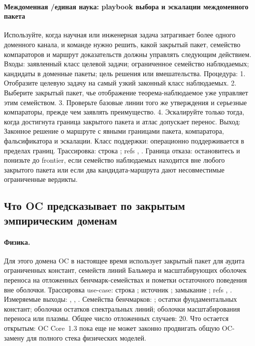 \paragraph{Междоменная /\allowbreak единая наука: playbook выбора и эскалации междоменного пакета}
Используйте, когда научная или инженерная задача затрагивает более одного доменного канала, и команде нужно решить, какой закрытый пакет, семейство компараторов и маршрут доказательств должны управлять следующим действием.
Входы: заявленный класс целевой задачи; \allowbreak ограниченное семейство наблюдаемых; \allowbreak кандидаты в доменные пакеты; \allowbreak цель решения или вмешательства.
Процедура: 1. Отобразите целевую задачу на самый узкий законный класс наблюдаемых. 2. Выберите закрытый пакет, чье отображение теорема-наблюдаемое уже управляет этим семейством. 3. Проверьте базовые линии того же утверждения и серьезные компараторы, прежде чем заявлять преимущество. 4. Эскалируйте только тогда, когда достигнута граница закрытого пакета и атлас допускает перенос.
Выход: Законное решение о маршруте с явными границами пакета, компаратора, фальсификатора и эскалации.
Класс поддержки: операционно поддерживается в пределах границ.
Трассировка: строка ; \allowbreak refs , \allowbreak {}.
Граница отказа: остановитесь и понизьте до frontier, если семейство наблюдаемых находится вне любого закрытого пакета или если два кандидата-маршрута дают несовместимые ограниченные вердикты.

\subsection{Что OC предсказывает по закрытым эмпирическим доменам}

\paragraph{Физика.}
Для этого домена OC в настоящее время использует закрытый пакет для аудита ограниченных констант, семейств линий Бальмера и масштабирующих оболочек переноса на отложенных бенчмарк-семействах и пометки остаточного поведения вне оболочки.
Трассировка use-case: строка ; \allowbreak источник ; \allowbreak замыкание ; \allowbreak refs , \allowbreak {}.
Измеряемые выходы: , , .
Семейства бенчмарков: ; остатки фундаментальных констант; оболочки остатков спектральных линий; оболочки масштабирования переноса или плазмы.
Общее число отложенных случаев: 20.
Что остается открытым: OC Core~1.3 пока еще не может законно продвигать общую OC-замену для полного стека физических моделей.

